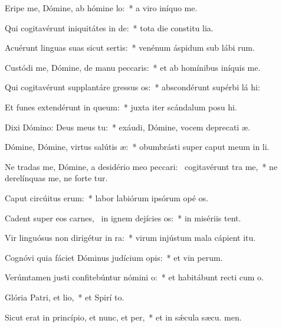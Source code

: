 \item Eripe me, Dómine, ab hómine lo:~* a viro iníquo  me.
\item Qui cogitavérunt iniquitátes in de:~* tota die constitu lia.
\item Acuérunt linguas suas sicut sertis:~* venénum áspidum sub lábi rum.
\item Custódi me, Dómine, de manu peccaris:~* et ab homínibus iníquis  me.
\item Qui cogitavérunt supplantáre gressus os:~* abscondérunt supérbi lá hi:
\item Et funes extendérunt in queum:~* juxta iter scándalum posu hi.
\item Dixi Dómino: Deus meus  tu:~* exáudi, Dómine, vocem deprecati æ.
\item Dómine, Dómine, virtus salútis æ:~* obumbrásti super caput meum in  li.
\item Ne tradas me, Dómine, a desidério meo peccari:~\pscross{} cogitavérunt tra me,~* ne derelínquas me, ne forte tur.
\item Caput circúitus erum:~* labor labiórum ipsórum opé os.
\item Cadent super eos carnes,~\pscross{} in ignem dejícies os:~* in misériis  tent.
\item Vir linguósus non dirigétur in ra:~* virum injústum mala cápient  itu.
\item Cognóvi quia fáciet Dóminus judícium opis:~* et vin perum.
\item Verúmtamen justi confitebúntur nómini o:~* et habitábunt recti cum  o.
\item Glória Patri, et lio,~* et Spirí to.
\item Sicut erat in princípio, et nunc, et per,~* et in sǽcula sæcu. men.
